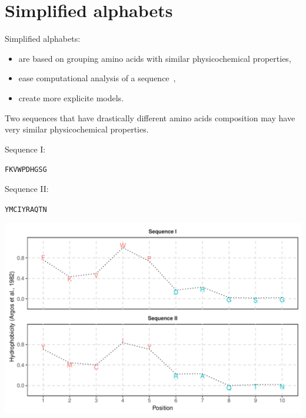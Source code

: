\documentclass{beamer}\usepackage[]{graphicx}\usepackage[]{color}
\makeatletter
\def\maxwidth{ %
  \ifdim\Gin@nat@width>\linewidth
    \linewidth
  \else
    \Gin@nat@width
  \fi
}
\makeatother
\begin{document}
\section{Simplified alphabets}

\begin{frame}
Simplified alphabets:
\begin{itemize}
\item are based on grouping amino acids with similar physicochemical properties,
\item ease computational analysis of a sequence~\citep{murphy_simplified_2000},
\item create more explicite models.
\end{itemize}
\end{frame}


\begin{frame}  
Two sequences that have drastically different amino acids composition may have very similar physicochemical properties.




Sequence I: 

\texttt{FKVWPDHGSG}

\medskip

Sequence II: 

\texttt{YMCIYRAQTN}

\end{frame}  


\begin{frame}

\includegraphics[width=\maxwidth]{figure/unnamed-chunk-8-1} 


\end{frame}  
\end{document}
